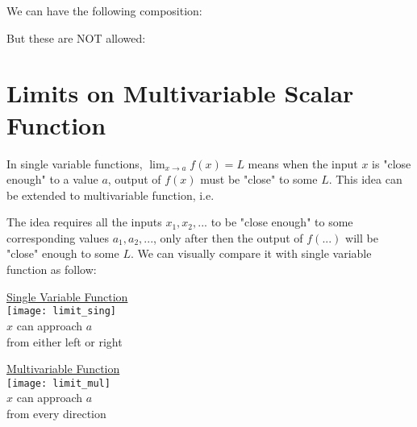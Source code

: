 \documentclass[class=article, crop=false, 12pt]{standalone}
\begin{document}
We can have the following composition:

But these are NOT allowed:

\linesep
\section{Limits on Multivariable Scalar Function}

In single variable functions, $\lim_{x\to a} f(x) = L$ means 
when the input $x$ is "close enough" to a value $a$, output of $f(x)$ must be "close" to some $L$.
This idea can be extended to multivariable function, i.e.

The idea requires all the inputs $x_1, x_2, ...$ to be "close enough" to some corresponding values $a_1, a_2,...$,
only after then the output of $f(...)$ will be "close" enough to some $L$. 
We can visually compare it with single variable function as follow:\\

\begin{center}
    \begin{minipage}{0.45\textwidth}
        \centering
        \ul{Single Variable Function}
        \\[1em]
        \texttt{[image: limit\_sing]}
        \\
        $x$ can approach $a$ \\
        from either left or right
    \end{minipage}
    \begin{minipage}{0.45\textwidth}
        \centering
        \ul{Multivariable Function}
        \\[1em]
        \texttt{[image: limit\_mul]}
        \\
        $x$ can approach $a$ \\
        from every direction
    \end{minipage}
\end{center}
\end{document}
